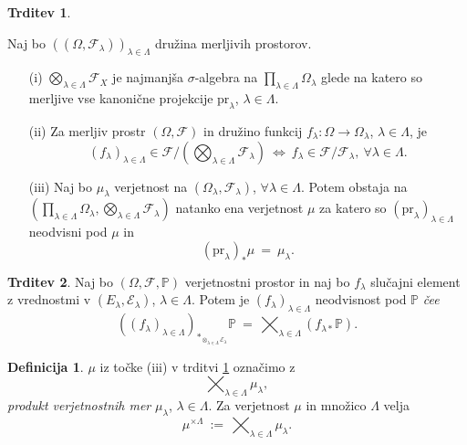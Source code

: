 \documentclass[11pt]{article}
\renewcommand{\P}{\mathbb{P}}
\newcommand{\F}{\mathcal{F}}
\newcommand{\EE}{\mathcal{E}}
\newcommand{\oklepaj}[1]{\left(#1\right)}
\newcommand{\1}{\mathbbm{1}}
\newcommand{\pr}{\text{pr}}
\theoremstyle{definition}
\newtheorem{definicija}{Definicija}[section]
\theoremstyle{definition}
\newtheorem{trditev}{Trditev}[section]
\theoremstyle{definition}
\theoremstyle{definition}
\begin{document}
\begin{trditev}\label{ref:3.7}

Naj bo $\oklepaj{(\Omega, \F_\lambda)}_{\lambda\in\Lambda}$ družina merljivih prostorov.
\begin{itemize}

\item[(i)] $\bigotimes_{\lambda\in\Lambda} \F_X$ je najmanjša $\sigma$-algebra na $\prod_{\lambda\in\Lambda} \Omega_\lambda$ glede na katero so merljive vse kanonične projekcije $\pr_\lambda$, $\lambda\in\Lambda$.

\item[(ii)] Za merljiv prostr $(\Omega, \F)$ in družino funkcij $f_\lambda: \Omega \rightarrow \Omega_\lambda$, $\lambda\in\Lambda$, je
$$(f_\lambda)_{\lambda\in\Lambda} \in \F/(\bigotimes_{\lambda\in\Lambda} \F_\lambda) ~\iff~ f_\lambda \in \F/\F_\lambda, ~ \forall \lambda \in \Lambda.$$

\item[(iii)] Naj bo $\mu_\lambda$ verjetnost na $(\Omega_\lambda, \F_\lambda)$, $\forall \lambda \in \Lambda$. Potem obstaja na $\oklepaj{\prod_{\lambda\in\Lambda}\Omega_\lambda, \bigotimes_{\lambda\in\Lambda} \F_\lambda}$ natanko ena verjetnost $\mu$ za katero so $(\pr_\lambda)_{\lambda\in\Lambda}$ neodvisni pod $\mu$ in
$$(\pr_\lambda)_*\mu ~=~ \mu_\lambda.$$

\end{itemize}

\end{trditev}
\vspace{0.5cm}

\begin{trditev}

Naj bo $(\Omega, \F, \P)$ verjetnostni prostor in naj bo $f_\lambda$ slučajni element z vrednostmi v $(E_\lambda, \EE_\lambda)$, $\lambda\in\Lambda$. Potem je $(f_\lambda)_{\lambda\in\Lambda}$ neodvisnost pod $\P$ \textit{čee}
$$\oklepaj{(f_\lambda)_{\lambda\in\Lambda}}_{*_{\otimes_{\lambda\in\Lambda}\EE_\lambda}}\P ~=~ \bigtimes_{\lambda\in\Lambda} ({f_{\lambda*}} \P).$$

\end{trditev}
\vspace{0.5cm}

\begin{definicija}

$\mu$ iz točke (iii) v trditvi \ref{ref:3.7} označimo z 
$$\bigtimes_{\lambda\in\Lambda} \mu_\lambda,$$
\textit{produkt verjetnostnih mer} $\mu_\lambda$, $\lambda\in\Lambda$. Za verjetnost $\mu$ in množico $\Lambda$ velja
$$\mu^{\times\Lambda} ~:=~ \bigtimes_{\lambda\in\Lambda} \mu_\lambda.$$

\end{definicija}
\vspace{0.5cm}
\end{document}
